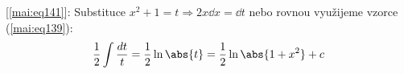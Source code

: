   [\ref{mai:eq141}]: Substituce \(x^2 + 1 = t  \Rightarrow 2x\dd{x} = \dd{t}\) nebo rovnou využijeme
  vzorce (\ref{mai:eq139}):
  \begin{equation*}
    \frac{1}{2}\int\frac{dt}{t} = \frac{1}{2}\ln\abs{t} =\frac{1}{2}\ln\abs{1+x^2}+ c
  \end{equation*}